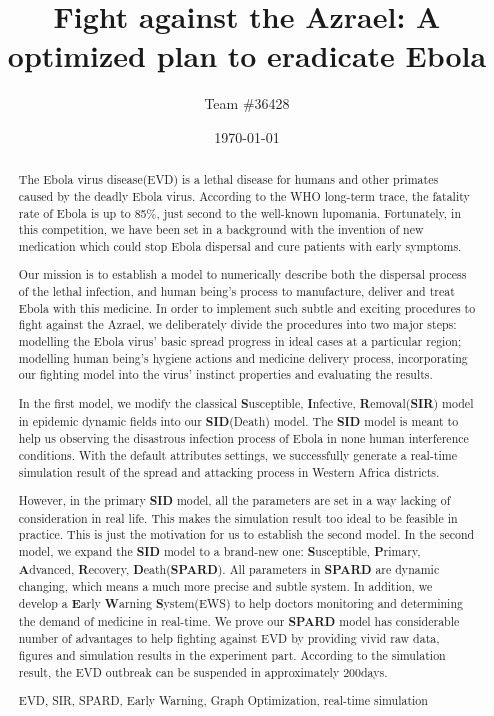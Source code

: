 \documentclass[a4paper,11pt]{article}
\title{Fight against the Azrael: A optimized plan to eradicate Ebola}
\author{Team \#36428}
\date{\today}
\begin{document}
   
\def\abstractname{Abstract}%
\begin{abstract}
  The Ebola virus disease(EVD) is a lethal disease for humans and other primates caused by the deadly Ebola virus. According to the WHO long-term trace, the fatality rate of Ebola is up to 85\%, just second to the well-known lupomania. Fortunately, in this competition, we have been set in a background with the invention of new medication which could stop Ebola dispersal and cure patients with early symptoms. 
  
  Our mission is to establish a model to numerically describe both the dispersal process of the lethal infection, and human being's process to manufacture, deliver and treat Ebola with this medicine. In order to implement such subtle and exciting procedures to fight against the Azrael, we deliberately divide the procedures into two major steps: modelling the Ebola virus' basic spread progress in ideal cases at a particular region; modelling human being's hygiene actions and medicine delivery process, incorporating our fighting model into the virus' instinct properties and evaluating the results.
  
  In the first model, we modify the classical \textbf{S}usceptible, \textbf{I}nfective, \textbf{R}emoval(\textbf{SIR}) model in epidemic dynamic fields into our \textbf{SID}(Death) model. The \textbf{SID} model is meant to help us observing the disastrous infection process of Ebola in none human interference conditions. With the default attributes settings, we successfully generate a real-time simulation result of the spread and attacking process in Western Africa districts. 
  
  However, in the primary \textbf{SID} model, all the parameters are set in a way lacking of consideration in real life. This makes the simulation result too ideal to be feasible in practice. This is just the motivation for us to establish the second model. In the second model, we expand the \textbf{SID} model to a brand-new one:  \textbf{S}usceptible, \textbf{P}rimary, \textbf{A}dvanced, \textbf{R}ecovery, \textbf{D}eath(\textbf{SPARD}). All parameters in \textbf{SPARD} are dynamic changing, which means a much more precise and subtle system. In addition, we develop a \textbf{E}arly \textbf{W}arning \textbf{S}ystem(EWS) to help doctors monitoring and determining the demand of medicine in real-time. We prove our \textbf{SPARD} model has considerable number of advantages to help fighting against EVD by providing vivid raw data, figures and simulation results in the experiment part. According to the simulation result, the EVD outbreak can be suspended in approximately 200days.
  
\begin{keywords}
EVD, SIR, SPARD, Early Warning, Graph Optimization, real-time simulation 
\end{keywords}
\end{abstract}
\end{document}
